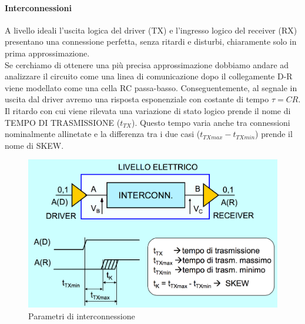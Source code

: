 \documentclass[12pt]{article}
\begin{document}
\paragraph{Interconnessioni}
A livello ideali l'uscita logica del driver (TX) e l'ingresso logico del receiver (RX) presentano una connessione perfetta, senza ritardi e disturbi, chiaramente solo in prima approssimazione.\\
Se cerchiamo di ottenere una più precisa approssimazione dobbiamo andare ad analizzare il circuito come una linea di comunicazione dopo il collegamente D-R viene modellato come una cella RC passa-basso. Conseguentemente, al segnale in uscita dal driver avremo una risposta esponenziale con costante di tempo $\tau = CR$. Il ritardo con cui viene rilevata una variazione di stato logico prende il nome di TEMPO DI TRASMISSIONE ($t_{TX}$). Questo tempo varia anche tra connessioni nominalmente allinetate e la differenza tra i due casi ($t_{TXmax}-t_{TXmin}$) prende il nome di SKEW.

\begin{figure}[!hp]
  \includegraphics[width=\textwidth]{images/interc.png}
  \caption{Parametri di interconnessione}
  \label{fig:interc}
\end{figure}

\end{document}
